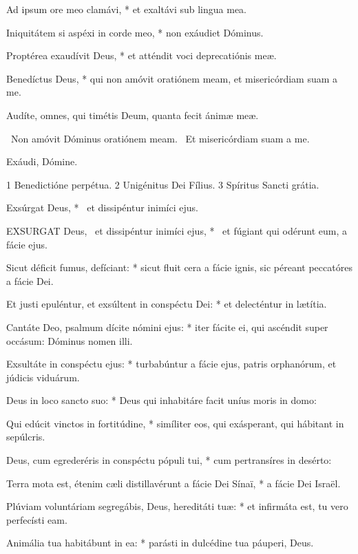 Ad ipsum ore meo clamávi, * et exaltávi sub lingua mea.

Iniquitátem si aspéxi in corde meo, * non exáudiet Dóminus.

Proptérea exaudívit Deus, * et atténdit voci deprecatiónis meæ.

Benedíctus Deus, * qui non amóvit oratiónem meam, et misericórdiam suam a me.

 Audíte, omnes, qui timétis Deum, quanta fecit ánimæ meæ.


\V\ Non amóvit Dóminus oratiónem meam. \R\ Et misericórdiam suam a me.

 Exáudi, Dómine.

 1 Benedictióne perpétua. 2 Unigénitus Dei Fílius. 3 Spíritus Sancti grátia.


 Exsúrgat Deus, * \textdagger\ et dissipéntur inimíci ejus. \textdaggerdbl


\lettrine[lines=2]{E}{XSURGAT} Deus, \textdagger\ et dissipéntur inimíci ejus, * \textdaggerdbl\ et fúgiant qui odérunt eum, a fácie ejus.

Sicut déficit fumus, defíciant: * sicut fluit cera a fácie ignis, sic péreant peccatóres a fácie Dei.

Et justi epuléntur, et exsúltent in conspéctu Dei: * et delecténtur in lætítia.

Cantáte Deo, psalmum dícite nómini ejus: * iter fácite ei, qui ascéndit super occásum: Dóminus nomen illi.

Exsultáte in conspéctu ejus: * turbabúntur a fácie ejus, patris orphanórum, et júdicis viduárum.

Deus in loco sancto suo: * Deus qui inhabitáre facit uníus moris in domo:

Qui edúcit vinctos in fortitúdine, * simíliter eos, qui exásperant, qui hábitant in sepúlcris.

Deus, cum egrederéris in conspéctu pópuli tui, * cum pertransíres in desérto:

Terra mota est, étenim cæli distillavérunt a fácie Dei Sínaï, * a fácie Dei Israël.

Plúviam voluntáriam segregábis, Deus, hereditáti tuæ: * et infirmáta est, tu vero perfecísti eam.

Animália tua habitábunt in ea: * parásti in dulcédine tua páuperi, Deus.


